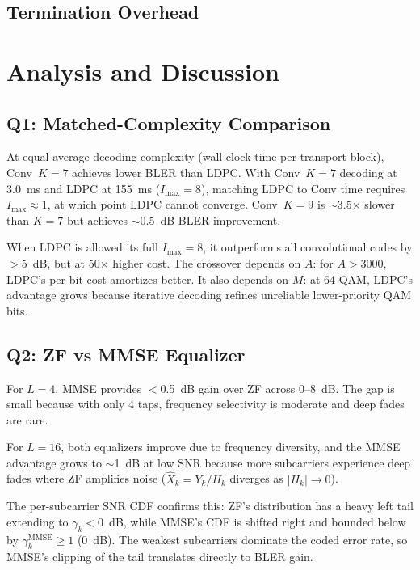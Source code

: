 \documentclass[12pt, a4paper]{article}
\begin{document}
\subsection{Termination Overhead}

\section{Analysis and Discussion}

\subsection{Q1: Matched-Complexity Comparison}
At equal average decoding complexity (wall-clock time per transport block), Conv~$K\!=\!7$ achieves lower BLER than LDPC. With Conv~$K\!=\!7$ decoding at 3.0~ms and LDPC at 155~ms ($I_{\max}\!=\!8$), matching LDPC to Conv time requires $I_{\max}\!\approx\!1$, at which point LDPC cannot converge. Conv~$K\!=\!9$ is $\sim$3.5$\times$ slower than $K\!=\!7$ but achieves $\sim$0.5~dB BLER improvement.

When LDPC is allowed its full $I_{\max}\!=\!8$, it outperforms all convolutional codes by $>$5~dB, but at 50$\times$ higher cost. The crossover depends on $A$: for $A>3000$, LDPC's per-bit cost amortizes better. It also depends on $M$: at 64-QAM, LDPC's advantage grows because iterative decoding refines unreliable lower-priority QAM bits.

\subsection{Q2: ZF vs MMSE Equalizer}
For $L=4$, MMSE provides $<$0.5~dB gain over ZF across 0--8~dB. The gap is small because with only 4 taps, frequency selectivity is moderate and deep fades are rare.

For $L=16$, both equalizers improve due to frequency diversity, and the MMSE advantage grows to $\sim$1~dB at low SNR because more subcarriers experience deep fades where ZF amplifies noise ($\hat{X}_k = Y_k/H_k$ diverges as $|H_k|\to 0$).

The per-subcarrier SNR CDF confirms this: ZF's distribution has a heavy left tail extending to $\gamma_k < 0$~dB, while MMSE's CDF is shifted right and bounded below by $\gamma_k^{\text{MMSE}} \geq 1$ (0~dB). The weakest subcarriers dominate the coded error rate, so MMSE's clipping of the tail translates directly to BLER gain.
\end{document}
